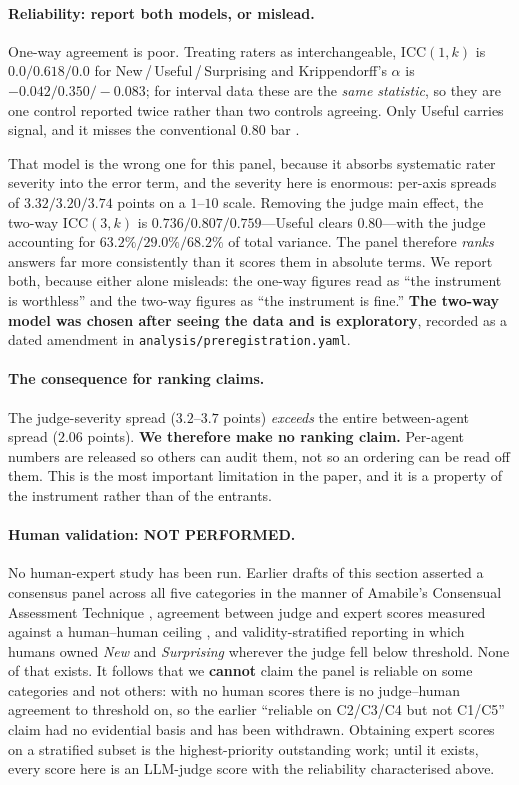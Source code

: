 \paragraph{Reliability: report both models, or mislead.} One-way agreement is poor. Treating raters as interchangeable, $\mathrm{ICC}(1,k)$ is $0.0 / 0.618 / 0.0$ for New\,/\,Useful\,/\,Surprising and Krippendorff's $\alpha$ is $-0.042 / 0.350 / -0.083$; for interval data these are the \emph{same statistic}, so they are one control reported twice rather than two controls agreeing. Only Useful carries signal, and it misses the conventional $0.80$ bar \citep{hayes2007alpha,koo2016icc}.

That model is the wrong one for this panel, because it absorbs systematic rater severity into the error term, and the severity here is enormous: per-axis spreads of $3.32 / 3.20 / 3.74$ points on a $1$--$10$ scale. Removing the judge main effect, the two-way $\mathrm{ICC}(3,k)$ is $0.736 / 0.807 / 0.759$---Useful clears $0.80$---with the judge accounting for $63.2\% / 29.0\% / 68.2\%$ of total variance. The panel therefore \emph{ranks} answers far more consistently than it scores them in absolute terms. We report both, because either alone misleads: the one-way figures read as ``the instrument is worthless'' and the two-way figures as ``the instrument is fine.'' \textbf{The two-way model was chosen after seeing the data and is exploratory}, recorded as a dated amendment in \texttt{analysis/preregistration.yaml}.

\paragraph{The consequence for ranking claims.} The judge-severity spread ($3.2$--$3.7$ points) \emph{exceeds} the entire between-agent spread ($2.06$ points). \textbf{We therefore make no ranking claim.} Per-agent numbers are released so others can audit them, not so an ordering can be read off them. This is the most important limitation in the paper, and it is a property of the instrument rather than of the entrants.

\paragraph{Human validation: NOT PERFORMED.} No human-expert study has been run. Earlier drafts of this section asserted a consensus panel across all five categories in the manner of Amabile's Consensual Assessment Technique \citep{amabile1982cat}, agreement between judge and expert scores measured against a human--human ceiling \citep{zheng2023mtbench}, and validity-stratified reporting in which humans owned \emph{New} and \emph{Surprising} wherever the judge fell below threshold. None of that exists. It follows that we \textbf{cannot} claim the panel is reliable on some categories and not others: with no human scores there is no judge--human agreement to threshold on, so the earlier ``reliable on C2/C3/C4 but not C1/C5'' claim had no evidential basis and has been withdrawn. Obtaining expert scores on a stratified subset is the highest-priority outstanding work; until it exists, every score here is an LLM-judge score with the reliability characterised above.

